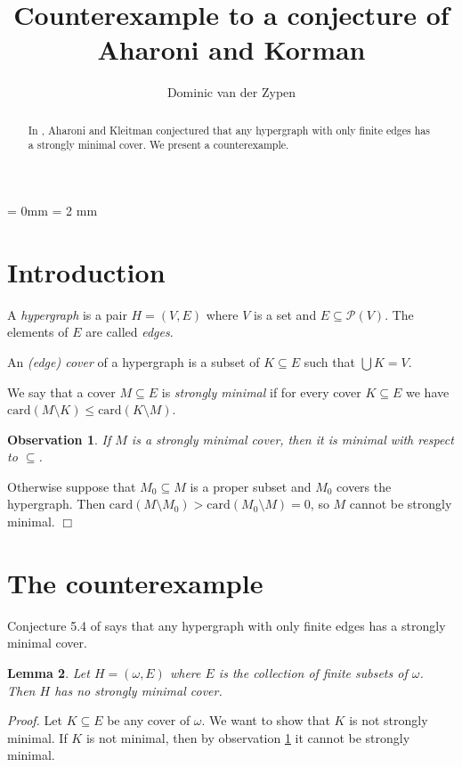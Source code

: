 \documentclass[12pt]{amsart}
\newtheorem{lemma}{\bf Lemma}[section]
\newtheorem{observation}[lemma]{\bf Observation}
\newcommand{\Pow}{{\mathcal P}}
\newcommand{\proofend}{{\hfill $\Box$}}
\newcommand{\card}{{\mathrm{card}}}
\begin{document}
\title{Counterexample to a conjecture of Aharoni and Korman}

\author{Dominic van der Zypen}
\address{Swiss Armed Forces, CH-3003 Bern,
Switzerland}


\begin{abstract}
	In \cite{Ah}, Aharoni and Kleitman conjectured that
	any hypergraph with only finite edges has a strongly
	minimal cover. We present a counterexample.
\end{abstract}
\parindent = 0mm
\parskip = 2 mm
\maketitle

\section{Introduction}

A {\em hypergraph} is a pair $H=(V,E)$
where $V$ is a set and $E\subseteq \Pow(V)$. The elements of
$E$ are called {\em edges}.

An {\em (edge) cover} of a hypergraph is a subset of 
$K\subseteq E$ such that $\bigcup K = V$. 

We say that a cover $M \subseteq E$ is {\em strongly minimal} if for every
cover $K\subseteq E$ we have $\card(M\setminus K) \leq \card(K\setminus M)$.

\begin{observation} \label{minobs} 
If $M$ is a strongly minimal cover, then it is minimal
with respect to $\subseteq$.\end{observation}
\proof Otherwise suppose that $M_0 \subseteq M$ is a proper subset and
$M_0$ covers the hypergraph. Then 
$\card(M\setminus M_0) > \card(M_0\setminus M) = 0$, so $M$ cannot be
strongly minimal. \proofend

\section{The counterexample}
Conjecture 5.4 of \cite{Ah} says that 
any hypergraph with only finite edges has a strongly
minimal cover. 
\begin{lemma} \label{mainlemma}
	Let $H= (\omega, E)$ where $E$ is the collection of 
	finite subsets of $\omega$. Then $H$ has no strongly minimal
	cover.
\end{lemma}
{\em Proof.} Let $K\subseteq E$ be any cover of $\omega$. We want to 
show that $K$ is not strongly minimal. If $K$ is not minimal, then
by observation \ref{minobs} it cannot be strongly minimal. 
\end{document}

